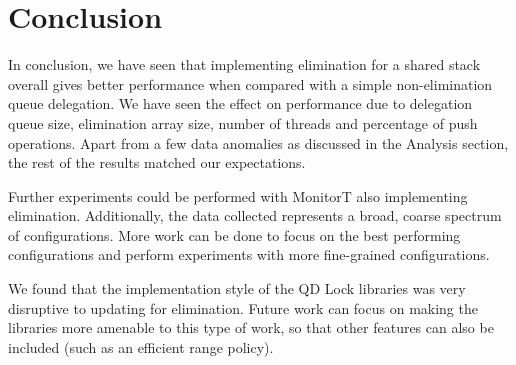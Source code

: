 \section{Conclusion}
In conclusion, we have seen that implementing elimination for a shared stack overall gives better performance when compared with a simple non-elimination queue delegation. We have seen the effect on performance due to delegation queue size, elimination array size, number of threads and percentage of push operations. Apart from a few data anomalies as discussed in the Analysis section, the rest of the results matched our expectations.

Further experiments could be performed with MonitorT also implementing elimination. Additionally, the data collected represents a broad, coarse spectrum of configurations. More work can be done to focus on the best performing configurations and perform experiments with more fine-grained configurations.

We found that the implementation style of the QD Lock libraries was very disruptive to updating for elimination. Future work can focus on making the libraries more amenable to this type of work, so that other features can also be included (such as an efficient range policy).

